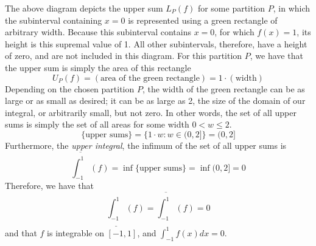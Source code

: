 \documentclass[10pt]{article}
\begin{document}
The above diagram depicts the upper sum $L_P(f)$ for some partition $P$, in which the subinterval containing $x=0$ is represented using a green rectangle of arbitrary width. Because this subinterval contains $x=0$, for which $f(x)=1$, its height is this supremal value of 1. All other subintervals, therefore, have a height of zero, and are not included in this diagram. For this partition $P$, we have that the upper sum is simply the area of this rectangle
$$
    U_P(f)=(\text{area of the green rectangle})=1\cdot(\text{width})
$$
Depending on the chosen partition $P$, the width of the green rectangle can be as large or as small as desired; it can be as large as 2, the size of the domain of our integral, or arbitrarily small, but not zero. In other words, the set of all upper sums is simply the set of all areas for some width $0<w\leq 2$.
$$
    \{\text{upper sums}\}=\{1\cdot w:w\in(0,2]\}=(0,2]
$$
Furthermore, the \textit{upper integral}, the infimum of the set of all upper sums is
$$
    \overline{\int_{-1}^{1}}(f)=\inf\{\text{upper sums}\}=\inf(0,2]=0
$$
Therefore, we have that
$$
    \underline{\int_{-1}^{1}}(f)=\overline{\int_{-1}^{1}}(f)=0
$$
and that $f$ is integrable on $[-1,1]$, and $\displaystyle\int_{-1}^1 f(x)dx=0$.
\end{document}
